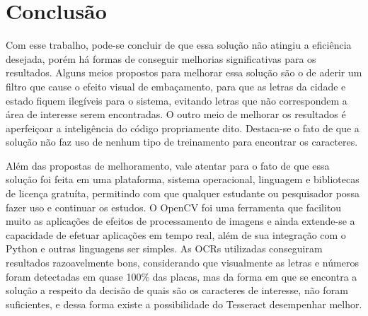 \documentclass[12pt, oneside, a4paper, brazil]{abntex2}
\begin{document}







\chapter{Conclusão}

Com esse trabalho, pode-se concluir de que essa solução não atingiu a eficiência desejada, porém há formas de conseguir melhorias significativas para os resultados. Alguns meios propostos para melhorar essa solução são o de aderir um filtro que cause o efeito visual de embaçamento, para que as letras da cidade e estado fiquem ilegíveis para o sistema, evitando letras que não correspondem a área de interesse serem encontradas. O outro meio de melhorar os resultados é aperfeiçoar a inteligência do código propriamente dito. Destaca-se o fato de que a solução não faz uso de nenhum tipo de treinamento para encontrar os caracteres. 

Além das propostas de melhoramento, vale atentar para o fato de que essa solução foi feita em uma plataforma, sistema operacional, linguagem e bibliotecas de licença gratuíta, permitindo com que qualquer estudante ou pesquisador possa fazer uso e continuar os estudos. O OpenCV foi uma ferramenta que facilitou muito as aplicações de efeitos de processamento de imagens e ainda extende-se a capacidade de efetuar aplicações em tempo real, além de sua integração com o Python e outras linguagens ser simples. As OCRs utilizadas conseguiram resultados razoavelmente bons, considerando que visualmente as letras e números foram detectadas em quase 100\% das placas, mas da forma em que se encontra a solução a respeito da decisão de quais são os caracteres de interesse, não foram suficientes, e dessa forma existe a possibilidade do Tesseract desempenhar melhor.
\postextual


\end{document}
